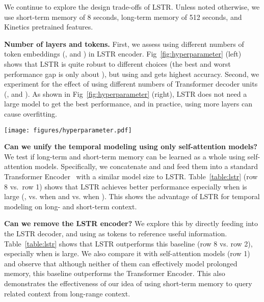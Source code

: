 We continue to explore the design trade-offs of LSTR.
Unless noted otherwise, we use short-term memory of 8 seconds, long-term memory of 512 seconds, and Kinetics pretrained features.

\textbf{Number of layers and tokens.}
First, we assess using different numbers of token embeddings (\ie,  and ) in LSTR encoder.
Fig~\ref{fig:hyperparameter} (left) shows that LSTR is quite robust to different choices (the best and worst performance gap is only about ), but using  and  gets highest accuracy.
Second, we experiment for the effect of using different numbers of Transformer decoder units (\ie,  and ).
As shown in Fig~\ref{fig:hyperparameter} (right), LSTR does not need a large model to get the best performance, and in practice, using more layers can  cause  overfitting.

\begin{figure*}[!htp]
    \vspace{-3mm}
    \begin{center}
        \texttt{[image: figures/hyperparameter.pdf]}
    \end{center}
    \vspace{-20pt}
    \caption{
        \textbf{Left}: Results of different number of token embeddings for our two-stage memory compression.
        \textbf{Right}: Results of different number of Transformer decoder units for  and .
    }
    \vspace{-5pt}
    \label{fig:hyperparameter}
\end{figure*}

\textbf{Can we unify the temporal modeling using only self-attention models?}
We test if long-term  and short-term  memory can be learned as a whole using self-attention models.
Specifically, we concatenate  and  and feed them into a standard Transformer Encoder~\cite{vaswani2017attention} with a similar model size to LSTR.
Table~\ref{table:lstr} (row 8 vs.~row 1) shows that LSTR achieves better performance especially when  is large (\eg,  vs.  when  and  vs.  when ).
This shows the advantage of LSTR for temporal modeling on long- and short-term context.

\textbf{Can we remove the LSTR encoder?}
We explore this by directly feeding  into the LSTR decoder, and using  as tokens to reference useful information.
Table~\ref{table:lstr} shows that LSTR outperforms this baseline (row 8 vs. row 2), especially when  is large.
We also compare it with self-attention models (row 1) and observe that although neither of them can effectively model prolonged memory, this baseline outperforms the Transformer Encoder.
This also demonstrates the effectiveness of our idea of using short-term memory to query related context from long-range context.

